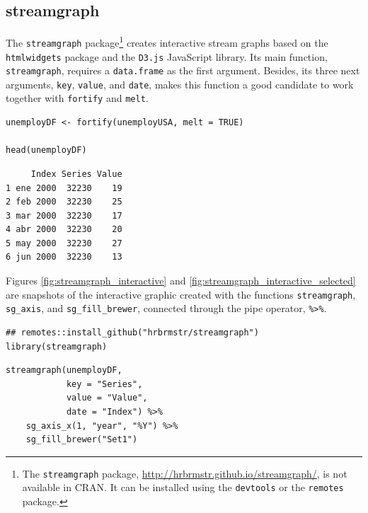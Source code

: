 \documentclass[smallroyalvopaper]{memoir}
\begin{document}
\subsection{streamgraph \label{sec:interactive_streamgraph}}
\label{sec:orge1606b4}

The \texttt{streamgraph} package\footnote{The \texttt{streamgraph} package, \url{http://hrbrmstr.github.io/streamgraph/}, is not available in CRAN. It can be installed using the \texttt{devtools} or the \texttt{remotes} package.} creates interactive stream graphs based on
the \texttt{htmlwidgets} package and the \texttt{D3.js} JavaScript library. Its main
function, \texttt{streamgraph}, requires a \texttt{data.frame} as the first
argument. Besides, its three next arguments, \texttt{key}, \texttt{value}, and
\texttt{date}, makes this function a good candidate to work together with
\texttt{fortify} and \texttt{melt}.


\lstset{language=r,label= ,caption= ,captionpos=b,numbers=none}
\begin{lstlisting}
unemployDF <- fortify(unemployUSA, melt = TRUE)

head(unemployDF)
\end{lstlisting}

\begin{verbatim}
     Index Series Value
1 ene 2000  32230    19
2 feb 2000  32230    25
3 mar 2000  32230    17
4 abr 2000  32230    20
5 may 2000  32230    27
6 jun 2000  32230    13
\end{verbatim}

Figures \ref{fig:streamgraph_interactive} and
\ref{fig:streamgraph_interactive_selected} are snapshots of the
interactive graphic created with the functions \texttt{streamgraph},
\texttt{sg\_axis}, and \texttt{sg\_fill\_brewer}, connected through the pipe operator,
\texttt{\%>\%}.


\lstset{language=r,label= ,caption= ,captionpos=b,numbers=none}
\begin{lstlisting}
## remotes::install_github("hrbrmstr/streamgraph")
library(streamgraph)
\end{lstlisting}

\lstset{language=r,label= ,caption= ,captionpos=b,numbers=none}
\begin{lstlisting}
streamgraph(unemployDF,
            key = "Series",
            value = "Value",
            date = "Index") %>%
    sg_axis_x(1, "year", "%Y") %>%
    sg_fill_brewer("Set1")
\end{lstlisting}
\end{document}
